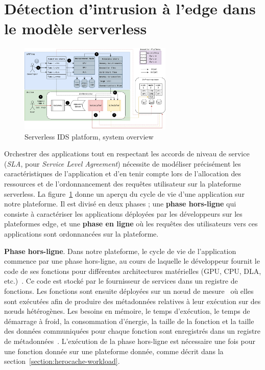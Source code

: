 \section{Détection d'intrusion à l'edge dans le modèle serverless}
\label{section:herocache-before-contrib}

\begin{figure}[!ht]
    \centering
    \includegraphics[width=0.65\textwidth]{5_Chapitre5/figures/serverless-platform-storage.png}
    \caption{Serverless IDS platform, system overview}
    \label{figure:herocache-serverless-platform}
\end{figure}

Orchestrer des applications tout en respectant les accords de niveau de service (\textit{SLA}, pour \textit{Service Level Agreement}) nécessite de modéliser précisément les caractéristiques de l'application et d'en tenir compte lors de l'allocation des ressources et de l'ordonnancement des requêtes utilisateur sur la plateforme serverless. La figure~\ref{figure:herocache-serverless-platform} donne un aperçu du cycle de vie d'une application sur notre plateforme. Il est divisé en deux phases ; une \textbf{phase hors-ligne} qui consiste à caractériser les applications déployées par les développeurs sur les plateformes edge, et une \textbf{phase en ligne} où les requêtes des utilisateurs vers ces applications sont ordonnancées sur la plateforme.

\textbf{Phase hors-ligne}. Dans notre plateforme, le cycle de vie de l'application commence par une phase hors-ligne, au cours de laquelle le développeur fournit le code de ses fonctions pour différentes architectures matérielles (GPU, CPU, DLA, etc.)~. Ce code est stocké par le fournisseur de services dans un registre de fonctions. Les fonctions sont ensuite déployées sur un nœud de mesure~ où elles sont exécutées afin de produire des métadonnées relatives à leur exécution sur des nœuds hétérogènes. Les besoins en mémoire, le temps d'exécution, le temps de démarrage à froid, la consommation d'énergie, la taille de la fonction et la taille des données communiquées pour chaque fonction sont enregistrés dans un registre de métadonnées~. L'exécution de la phase hors-ligne est nécessaire une fois pour une fonction donnée sur une plateforme donnée, comme décrit dans la section~\ref{section:herocache-workload}.

